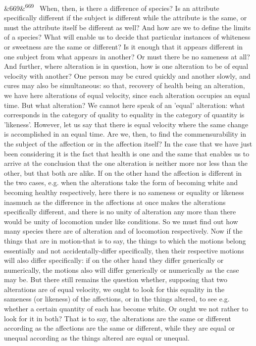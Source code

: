 \documentclass[12pt]{article}
\newcommand{\para}[1][]{\par\noindent\ifx&#1&\else\textsuperscript{\footnotesize #1}~\fi}
\begin{document}
\para[669] When, then, is there a difference of species? Is an attribute specifically different if the subject is different while the attribute is the same, or must the attribute itself be different as well? And how are we to define the limits of a species? What will enable us to decide that particular instances of whiteness or sweetness are the same or different? Is it enough that it appears different in one subject from what appears in another? Or must there be no sameness at all? And further, where alteration is in question, how is one alteration to be of equal velocity with another? One person may be cured quickly and another slowly, and cures may also be simultaneous: so that, recovery of health being an alteration, we have here alterations of equal velocity, since each alteration occupies an equal time. But what alteration? We cannot here speak of an 'equal' alteration: what corresponds in the category of quality to equality in the category of quantity is 'likeness'. However, let us say that there is equal velocity where the same change is accomplished in an equal time. Are we, then, to find the commensurability in the subject of the affection or in the affection itself? In the case that we have just been considering it is the fact that health is one and the same that enables us to arrive at the conclusion that the one alteration is neither more nor less than the other, but that both are alike. If on the other hand the affection is different in the two cases, e.g. when the alterations take the form of becoming white and becoming healthy respectively, here there is no sameness or equality or likeness inasmuch as the difference in the affections at once makes the alterations specifically different, and there is no unity of alteration any more than there would be unity of locomotion under like conditions. So we must find out how many species there are of alteration and of locomotion respectively. Now if the things that are in motion-that is to say, the things to which the motions belong essentially and not accidentally-differ specifically, then their respective motions will also differ specifically: if on the other hand they differ generically or numerically, the motions also will differ generically or numerically as the case may be. But there still remains the question whether, supposing that two alterations are of equal velocity, we ought to look for this equality in the sameness (or likeness) of the affections, or in the things altered, to see e.g. whether a certain quantity of each has become white. Or ought we not rather to look for it in both? That is to say, the alterations are the same or different according as the affections are the same or different, while they are equal or unequal according as the things altered are equal or unequal.
\end{document}
